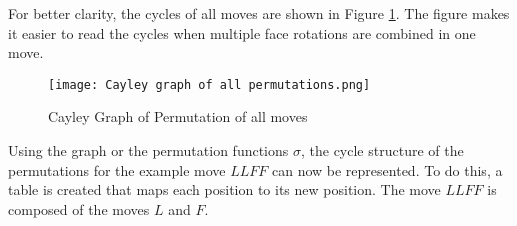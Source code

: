 For better clarity, the cycles of all moves are shown in Figure \ref{Figure_GraphAllerPermutations}. The figure makes it easier to read the cycles when multiple face rotations are combined in one move.

\begin{figure}[H]
\centering
\texttt{[image: Cayley graph of all permutations.png]}
\caption[Graph of all move permutations]{Cayley Graph of Permutation of all moves}
\label{Figure_GraphAllerPermutations}
\end{figure}

Using the graph or the permutation functions $\sigma$, the cycle structure of the permutations for the example move $LLFF$ can now be represented.
To do this, a table is created that maps each position to its new position. The move $LLFF$ is composed of the moves $L$ and $F$.

